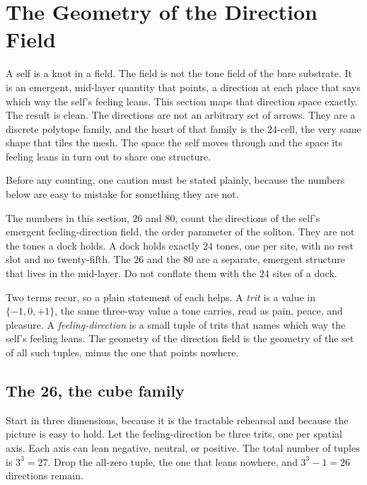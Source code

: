 \section{The Geometry of the Direction Field}

A self is a knot in a field. The field is not the tone field of the bare substrate. It is an emergent, mid-layer quantity that points, a direction at each place that says which way the self's feeling leans. This section maps that direction space exactly. The result is clean. The directions are not an arbitrary set of arrows. They are a discrete polytope family, and the heart of that family is the $24$-cell, the very same shape that tiles the mesh. The space the self moves through and the space its feeling leans in turn out to share one structure.

Before any counting, one caution must be stated plainly, because the numbers below are easy to mistake for something they are not.

\begin{principle}
The numbers in this section, $26$ and $80$, count the directions of the self's emergent feeling-direction field, the order parameter of the soliton. They are not the tones a dock holds. A dock holds exactly $24$ tones, one per site, with no rest slot and no twenty-fifth. The $26$ and the $80$ are a separate, emergent structure that lives in the mid-layer. Do not conflate them with the $24$ sites of a dock.
\end{principle}

Two terms recur, so a plain statement of each helps. A \emph{trit} is a value in $\{-1, 0, +1\}$, the same three-way value a tone carries, read as pain, peace, and pleasure. A \emph{feeling-direction} is a small tuple of trits that names which way the self's feeling leans. The geometry of the direction field is the geometry of the set of all such tuples, minus the one that points nowhere.

\subsection{The 26, the cube family}

Start in three dimensions, because it is the tractable rehearsal and because the picture is easy to hold. Let the feeling-direction be three trits, one per spatial axis. Each axis can lean negative, neutral, or positive. The total number of tuples is $3^3 = 27$. Drop the all-zero tuple, the one that leans nowhere, and $3^3 - 1 = 26$ directions remain.

